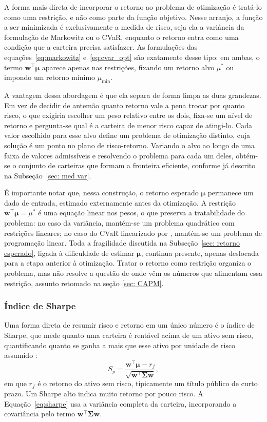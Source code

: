 \documentclass[12pt,a4paper]{article}
\begin{document}
A forma mais direta de incorporar o retorno ao problema de otimização é tratá-lo como uma restrição, e não como parte da função objetivo. Nesse arranjo, a função a ser minimizada é exclusivamente a medida de risco, seja ela a variância da formulação de Markowitz ou o CVaR, enquanto o retorno entra como uma condição que a carteira precisa satisfazer. As formulações das equações~\eqref{eq:markowitz} e~\eqref{eq:cvar_opt} são exatamente desse tipo: em ambas, o termo $\mathbf{w}^\top \boldsymbol{\mu}$ aparece apenas nas restrições, fixando um retorno alvo $\mu^\ast$ ou impondo um retorno mínimo $\mu_{\min}$.

A vantagem dessa abordagem é que ela separa de forma limpa as duas grandezas. Em vez de decidir de antemão quanto retorno vale a pena trocar por quanto risco, o que exigiria escolher um peso relativo entre os dois, fixa-se um nível de retorno e pergunta-se qual é a carteira de menor risco capaz de atingi-lo. Cada valor escolhido para esse alvo define um problema de otimização distinto, cuja solução é um ponto no plano de risco-retorno. Variando o alvo ao longo de uma faixa de valores admissíveis e resolvendo o problema para cada um deles, obtém-se o conjunto de carteiras que formam a fronteira eficiente, conforme já descrito na Subseção~\ref{sec: med var}.

É importante notar que, nessa construção, o retorno esperado $\boldsymbol{\mu}$ permanece um dado de entrada, estimado externamente antes da otimização. A restrição $\mathbf{w}^\top \boldsymbol{\mu} = \mu^\ast$ é uma equação linear nos pesos, o que preserva a tratabilidade do problema: no caso da variância, mantém-se um problema quadrático com restrições lineares; no caso do CVaR linearizado por , mantém-se um problema de programação linear. Toda a fragilidade discutida na Subseção~\ref{sec: retorno esperado}, ligada à dificuldade de estimar $\boldsymbol{\mu}$, continua presente, apenas deslocada para a etapa anterior à otimização. Tratar o retorno como restrição organiza o problema, mas não resolve a questão de onde vêm os números que alimentam essa restrição, assunto retomado na seção \ref{sec: CAPM}.

\subsubsection{Índice de Sharpe}
\label{sec: sharpe}

Uma forma direta de resumir risco e retorno em um único número é o índice de Sharpe, que mede quanto uma carteira é rentável acima de um ativo sem risco, quantificando quanto se ganha a mais que esse ativo por unidade de risco assumido \cite{sharpe1994sharpe}:
\begin{equation}
S_p = \frac{\mathbf{w}^\top \boldsymbol{\mu} - r_f}{\sqrt{\mathbf{w}^\top \boldsymbol{\Sigma} \mathbf{w}}},
\label{eq:sharpe}
\end{equation}
em que $r_f$ é o retorno do ativo sem risco, tipicamente um título público de curto prazo. Um Sharpe alto indica muito retorno por pouco risco. A Equação~\eqref{eq:sharpe} usa a variância completa da carteira, incorporando a covariância pelo termo $\mathbf{w}^\top \boldsymbol{\Sigma} \mathbf{w}$.
\end{document}
